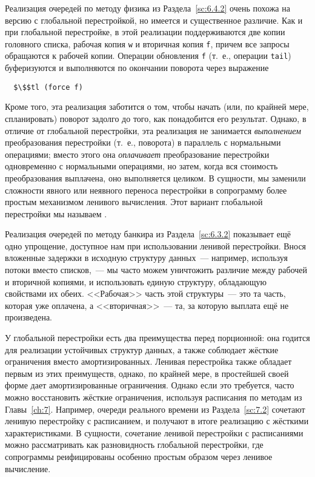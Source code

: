 Реализация очередей по методу физика из Раздела~\ref{sc:6.4.2} очень
похожа на версию с глобальной перестройкой, но имеется и существенное
различие. Как и при глобальной перестройке, в этой реализации
поддерживаются две копии головного списка, рабочая копия \lstinline!w!
и вторичная копия \lstinline!f!, причем все запросы обращаются к
рабочей копии. Операции обновления \lstinline!f! (т.~е., операции
\lstinline!tail!) буферизуются и выполняются по окончании поворота
через выражение
\begin{lstlisting}
  $\$$tl (force f)
\end{lstlisting}
Кроме того, эта реализация заботится о том, чтобы начать
(или, по крайней мере, спланировать) поворот задолго до того, как
понадобится его результат. Однако, в отличие от глобальной
перестройки, эта реализация не занимается \emph{выполнением}
преобразования перестройки (т.~е., поворота) в параллель с нормальными
операциями; вместо этого она \emph{оплачивает} преобразование
перестройки одновременно с нормальными операциями, но затем, когда вся
стоимость преобразования выплачена, оно выполняется целиком. В
сущности, мы заменили сложности явного или неявного переноса
перестройки в сопрограмму более простым механизмом ленивого
вычисления. Этот вариант глобальной перестройки мы называем
.

Реализация очередей по методу банкира из Раздела~\ref{sc:6.3.2}
показывает ещё одно упрощение, доступное нам при использовании ленивой
перестройки. Внося вложенные задержки в исходную структуру данных~---
например, используя потоки вместо списков,~--- мы часто можем
уничтожить различие между рабочей и вторичной копиями, и использовать
единую структуру, обладающую свойствами их обеих. <<Рабочая>> часть
этой структуры~--- это та часть, которая уже оплачена, а
<<вторичная>>~--- та, за которую выплата ещё не произведена.

У глобальной перестройки есть два преимущества перед 
порционной: она годится для реализации устойчивых структур данных, а
также соблюдает жёсткие ограничения вместо амортизированных. Ленивая
перестройка также обладает первым из этих преимуществ, однако, по
крайней мере, в простейшей своей форме дает амортизированные
ограничения. Однако если это требуется, часто можно восстановить
жёсткие ограничения, используя расписания по методам из
Главы~\ref{ch:7}. Например, очереди реального времени из
Раздела~\ref{sc:7.2} сочетают ленивую перестройку с расписанием, и
получают в итоге реализацию с жёсткими характеристиками. В сущности,
сочетание ленивой перестройки с расписаниями можно рассматривать как
разновидность глобальной перестройки, где сопрограммы реифицированы
особенно простым образом через ленивое вычисление.

